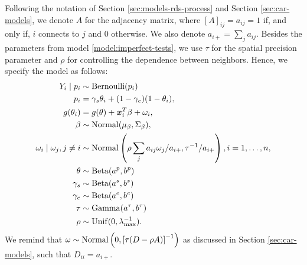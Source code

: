 Following the notation of Section \ref{sec:models-rds-process} and Section
\ref{sec:car-models}, we denote $A$ for the adjacency matrix, where $[A]_{ij}
  =a_{ij} = 1$ if, and only if, $i$ connects to $j$ and $0$ otherwise. We also
denote $a_{i+} = \sum_j a_{ij}$. Besides the
parameters from model \ref{model:imperfect-tests}, we use $\tau$
for the spatial precision parameter and $\rho$ for controlling the dependence between neighbors. Hence, we specify
the model as follows:
\begin{equation}
  \label{model:imperfect-tests-rds}
  \begin{aligned}
    Y_i \mid p_i                     & \sim \operatorname{Bernoulli}(p_i)                                                                               \\
    p_i                              & = \gamma_s\theta_i + (1-\gamma_e)(1 - \theta_i),                                              \\
    g(\theta_i)                      & = g(\theta) + \boldsymbol{x}_i^T\beta + \omega_i,                                                         \\
    \beta                            & \sim \operatorname{Normal}(\mu_{\beta}, \Sigma_{\beta}),                                                         \\
    \omega_i \mid \omega_j, j \neq i & \sim \operatorname{Normal}\left(\rho\sum_j a_{ij} \omega_j / a_{i+}, \tau^{-1} / a_{i+}\right), i = 1, \dots, n,
    \\
    \theta                           & \sim \operatorname{Beta}(a^p, b^p)                                                                      \\
    \gamma_s                         & \sim \operatorname{Beta}(a^s, b^s)                                                                      \\
    \gamma_e                         & \sim \operatorname{Beta}(a^e, b^e)                                                                      \\
    \tau                             & \sim \operatorname{Gamma}(a^{\tau}, b^{\tau})                                                 \\
    \rho                             & \sim \operatorname{Unif}(0,\lambda_{\max}^{-1}).
  \end{aligned}
\end{equation}
We remind that $\omega \sim \operatorname{Normal}\left(0, \left[\tau (D - \rho
      A)\right]^{-1}\right)$ as discussed in Section \ref{sec:car-models}, such that
$D_{ii} = a_{i+}$.

